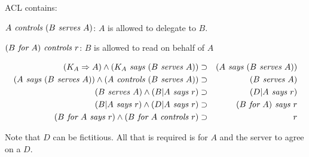 ACL contains:
\begin{citemize}
  \item $A \textit{ controls } (B \textit{ serves } A)$: $A$ is allowed to delegate to $B$.
  \item $(B \textit{ for } A) \textit{ controls } r$: $B$ is allowed to read on behalf of $A$
\end{citemize}

\stopslide



\begin{eqnarray*}
  (K_A \Rightarrow A) \wedge (K_A \textit{ says } (B \textit{ serves } A)) & \supset & (A \textit{ says }
    (B \textit{ serves } A)) \\
  (A \textit{ says } (B \textit{ serves } A)) \wedge (A \textit{ controls } (B \textit{ serves } A)) & \supset
    & (B \textit{ serves } A) \\
  (B \textit{ serves } A) \wedge (B|A \textit{ says } r) & \supset & (D|A \textit{ says } r) \\
  (B|A \textit{ says } r) \wedge (D|A \textit{ says } r) & \supset & (B \textit{ for } A) \textit{ says } r \\
  (B \textit{ for } A \textit{ says } r) \wedge (B \textit{ for } A \textit{ controls } r) & \supset & r
\end{eqnarray*}

Note that $D$ can be fictitious. All that is required is for $A$ and the
server to agree on a $D$.

\stopslide
